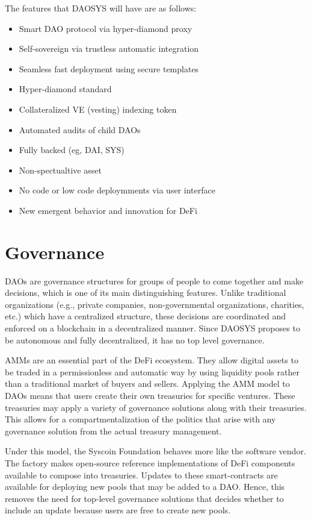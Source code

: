 \documentclass[journal,twocolumn,12pt]{ieeesyscoin}
\begin{document}
The features that DAOSYS will have are as follows:

\begin{itemize}
  \item Smart DAO protocol via hyper-diamond proxy
  \item Self-sovereign via trustless automatic integration
  \item Seamless fast deployment using secure templates
  \item Hyper-diamond standard
  \item Collateralized VE (vesting) indexing token
  \item Automated audits of child DAOs
  \item Fully backed (eg, DAI, SYS)
  \item Non-spectualtive asset
  \item No code or low code deploymments via user interface
  \item New emergent behavior and innovation for DeFi
\end{itemize}  

\section{Governance}
\label{sec:governance}

DAOs are governance structures for groups of people to come together and make decisions, which is one of its main distinguishing features. Unlike traditional organizations (e.g., private companies, non-governmental organizations, charities, etc.) which have a centralized structure, these decisions are coordinated and enforced on a blockchain in a decentralized manner. Since DAOSYS proposes to be autonomous and fully decentralized, it has no top level governance.

AMMs are an essential part of the DeFi ecosystem. They allow digital assets to be traded in a permissionless and automatic way by using liquidity pools rather than a traditional market of buyers and sellers. Applying the AMM model to DAOs means that users create their own treasuries for specific ventures. These treasuries may apply a variety of governance solutions along with their treasuries. This allows for a compartmentalization of the politics that arise with any governance solution from the actual treasury management.

Under this model, the Syscoin Foundation behaves more like the software vendor. The factory makes open-source reference implementations of DeFi components available to compose into treasuries. Updates to these smart-contracts are available for deploying new pools that may be added to a DAO. Hence, this removes the need for top-level governance solutions that decides whether to include an update because users are free to create new pools.
\end{document}
